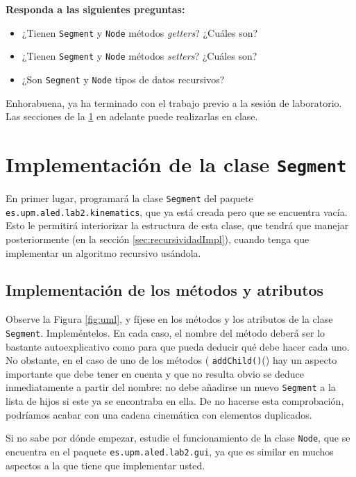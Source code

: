 \documentclass[10pt,a4paper,spanish]{article}
\newcommand{\code}[1]{\texttt{#1}}
\begin{document}
\textbf{Responda a las siguientes preguntas:}

\begin{itemize}
    \item ¿Tienen \code{Segment} y \code{Node} métodos \textit{getters}? ¿Cuáles son?
    \item ¿Tienen \code{Segment} y \code{Node} métodos \textit{setters}? ¿Cuáles son?
    \item ¿Son \code{Segment} y \code{Node} tipos de datos recursivos?
\end{itemize}

Enhorabuena, ya ha terminado con el trabajo previo a la sesión de laboratorio. Las secciones de la \ref{sec:laboratorio} en adelante puede realizarlas en clase.

\section{Implementación de la clase \code{Segment}}
\label{sec:laboratorio}

En primer lugar, programará la clase \code{Segment} del paquete \code{es.upm.aled.lab2.kinematics}, que ya está creada pero que se encuentra vacía. Esto le permitirá interiorizar la estructura de esta clase, que tendrá que manejar posteriormente (en la sección \ref{sec:recursividadImpl}), cuando tenga que implementar un algoritmo recursivo usándola.

\subsection{Implementación de los métodos y atributos}
\label{sec:implSegment}

Observe la Figura \ref{fig:uml}, y fíjese en los métodos y los atributos de la clase \code{Segment}. Impleméntelos. En cada caso, el nombre del método deberá ser lo bastante autoexplicativo como para que pueda deducir qué debe hacer cada uno. No obstante, en el caso de uno de los métodos ( \code{addChild()}() hay un aspecto importante que debe tener en cuenta y que no resulta obvio se deduce inmediatamente a partir del nombre: no debe añadirse un nuevo \code{Segment} a la lista de hijos si este ya se encontraba en ella. De no hacerse esta comprobación, podríamos acabar con una cadena cinemática con elementos duplicados.

Si no sabe por dónde empezar, estudie el funcionamiento de la clase \code{Node}, que se encuentra en el paquete \code{es.upm.aled.lab2.gui}, ya que es similar en muchos aspectos a la que tiene que implementar usted.
\end{document}
